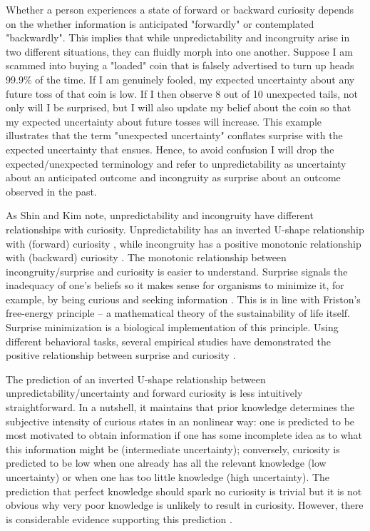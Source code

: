 Whether a person experiences a state of forward or backward curiosity depends on the whether information is anticipated "forwardly" or contemplated "backwardly". This implies that while unpredictability and incongruity arise in two different situations, they can fluidly morph into one another. Suppose I am scammed into buying a "loaded" coin that is falsely advertised to turn up heads 99.9\% of the time. If I am genuinely fooled, my expected uncertainty about any future toss of that coin is low. If I then observe 8 out of 10 unexpected tails, not only will I be surprised, but I will also update my belief about the coin so that my expected uncertainty about future tosses will increase. This example illustrates that the term "unexpected uncertainty" conflates surprise \cite{barto_novelty_2013} with the expected uncertainty that ensues. Hence, to avoid confusion I will drop the expected/unexpected terminology and refer to unpredictability as uncertainty about an anticipated outcome and incongruity as surprise about an outcome observed in the past.

As Shin and Kim \cite{shin_homo_2019} note, unpredictability and incongruity have different relationships with curiosity. Unpredictability has an inverted U-shape relationship with (forward) curiosity \cite{berlyne_theory_1954,day_curiosity_1982,loewenstein_psychology_1994}, while incongruity has a positive monotonic relationship with (backward) curiosity \cite{horstmann_surprise-attention_2015}. The monotonic relationship between incongruity/surprise and curiosity is easier to understand. Surprise signals the inadequacy of one's beliefs so it makes sense for organisms to minimize it, for example, by being curious and seeking information \cite{schwartenbeck_computational_2019}. This is in line with Friston's \cite{friston_free-energy_2009} free-energy principle -- a mathematical theory of the sustainability of life itself. Surprise minimization is a biological implementation of this principle. Using different behavioral tasks, several empirical studies have demonstrated the positive relationship between surprise and curiosity \cite{berlyne_experimental_1954,itti_bayesian_2009,poli_infants_2020}.

The prediction of an inverted U-shape relationship between unpredictability/uncertainty and forward curiosity is less intuitively straightforward. In a nutshell, it maintains that prior knowledge determines the subjective intensity of curious states in an nonlinear way: one is predicted to be most motivated to obtain information if one has some incomplete idea as to what this information might be (intermediate uncertainty); conversely, curiosity is predicted to be low when one already has all the relevant knowledge (low uncertainty) or when one has too little knowledge (high uncertainty). The prediction that perfect knowledge should spark no curiosity is trivial but it is not obvious why very poor knowledge is unlikely to result in curiosity. However, there is considerable evidence supporting this prediction \cite{berlyne_experimental_1954,day_prior_1972,loewenstein_psychology_1994,kang_wick_2009,baranes_eye_2015}.

